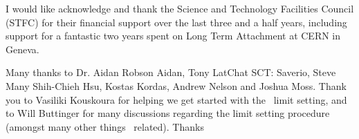 I would like acknowledge and thank the Science and Technology Facilities Council
(STFC) for their financial support over the last three and a half years,
including support for a fantastic two years spent on Long Term Attachment at CERN
in Geneva.

Many thanks to Dr. Aidan Robson
Aidan, Tony
LatChat
SCT: Saverio, Steve
Many Shih-Chieh Hsu, Kostas Kordas, Andrew Nelson and Joshua Moss. Thank you to Vasiliki Kouskoura for
helping we get started with the \TGC\ limit setting, and to Will Buttinger for
many discussions regarding the limit setting procedure (amongst many other
things \ZZ\ related).
Thanks
